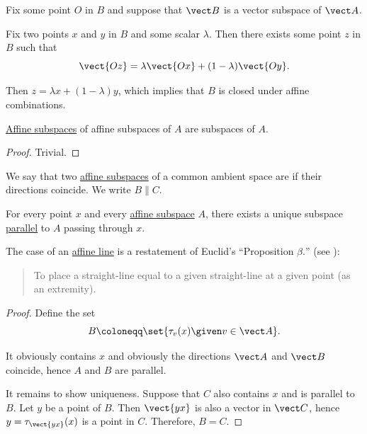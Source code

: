 \begin{defproof}
   Fix some point \( O \) in \( B \) and suppose that \( \vect B \) is a vector subspace of \( \vect A \).

  Fix two points \( x \) and \( y \) in \( B \) and some scalar \( \lambda \). Then there exists some point \( z \) in \( B \) such that
  \begin{equation*}
    \vect{Oz} = \lambda \vect{Ox} + (1 - \lambda) \vect{Oy}.
  \end{equation*}

  Then \( z = \lambda x + (1 - \lambda) y \), which implies that \( B \) is closed under affine combinations.
\end{defproof}

\begin{proposition}\label{thm:affine_subspace_of_subspace}
  \hyperref[def:affine_subspace]{Affine subspaces} of affine subspaces of \( A \) are subspaces of \( A \).
\end{proposition}
\begin{proof}
  Trivial.
\end{proof}

\begin{definition}\label{def:affine_parallelism}
  We say that two \hyperref[def:affine_subspace]{affine subspaces} of a common ambient space are  if their directions coincide. We write \( B \parallel C \).
\end{definition}

\begin{proposition}\label{thm:parallel_subspace_through_point}
  For every point \( x \) and every \hyperref[def:affine_subspace]{affine subspace} \( A \), there exists a unique subspace \hyperref[def:affine_parallelism]{parallel} to \( A \) passing through \( x \).

  The case of an \hyperref[def:affine_line]{affine line} is a restatement of Euclid's \enquote{Proposition \( \beta. \)} (see \cite[8]{Euclid2008Elements}):
  \begin{quote}
    To place a straight-line equal to a given straight-line at a given point (as an extremity).
  \end{quote}
\end{proposition}
\begin{proof}
  Define the set
  \begin{equation*}
    B \coloneqq \set{ \tau_v(x) \given v \in \vect A }.
  \end{equation*}

  It obviously contains \( x \) and obviously the directions \( \vect A \) and \( \vect B \) coincide, hence \( A \) and \( B \) are parallel.

  It remains to show uniqueness. Suppose that \( C \) also contains \( x \) and is parallel to \( B \). Let \( y \) be a point of \( B \). Then \( \vect{yx} \) is also a vector in \( \vect C \), hence \( y = \tau_{\vect{yx}}(x) \) is a point in \( C \). Therefore, \( B = C \).
\end{proof}

